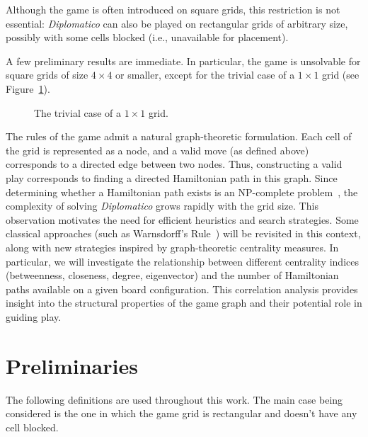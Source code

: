 \documentclass[conference]{IEEEtran}
\begin{document}
Although the game is often introduced on square grids, this restriction is not essential: \textit{Diplomatico} can also be played on rectangular grids of arbitrary size, possibly with some cells blocked (i.e., unavailable for placement).

A few preliminary results are immediate. 
In particular, the game is unsolvable for square grids of size $4 \times 4$ or smaller, except for the trivial case of a $1 \times 1$ grid (see Figure~\ref{fig:trivial_case}).

\begin{figure}[ht]
	\centering
	\caption{The trivial case of a $1 \times 1$ grid.}
	\label{fig:trivial_case}
\end{figure}

The rules of the game admit a natural graph-theoretic formulation. 
Each cell of the grid is represented as a node, and a valid move (as defined above) corresponds to a directed edge between two nodes. 
Thus, constructing a valid play corresponds to finding a directed Hamiltonian path in this graph. 
Since determining whether a Hamiltonian path exists is an NP-complete problem~\cite{np}, the complexity of solving \textit{Diplomatico} grows rapidly with the grid size. 
This observation motivates the need for efficient heuristics and search strategies. 
Some classical approaches (such as Warnsdorff's Rule~\cite{warnsdorff}) will be revisited in this context, along with new strategies inspired by graph-theoretic centrality measures. 
In particular, we will investigate the relationship between different centrality indices (betweenness, closeness, degree, eigenvector) and the number of Hamiltonian paths available on a given board configuration. 
This correlation analysis provides insight into the structural properties of the game graph and their potential role in guiding play.

\section{Preliminaries}
The following definitions are used throughout this work. The main case being considered is the one in which the game grid is rectangular and doesn't have any cell blocked.
\end{document}
